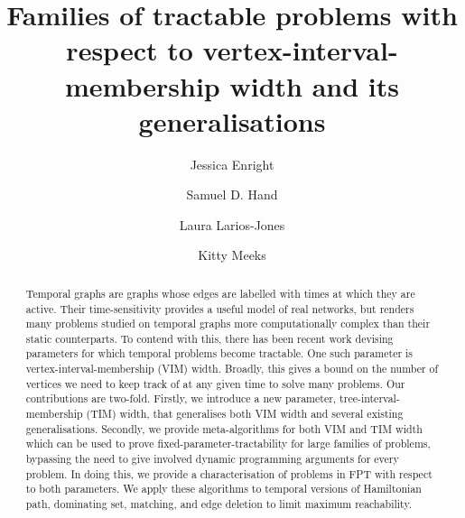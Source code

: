 \documentclass[a4paper,UKenglish,cleveref, autoref, thm-restate]{lipics-v2021} %
\title{Families of tractable problems with respect to vertex-interval-membership width and its generalisations } %
\author{Jessica Enright}{School of Computing Science, University of Glasgow, UK}{jessica.enright@glasgow.ac.uk}{0000-0002-0266-3292}{Supported by EPSRC grant EP/T004878/1.}
\author{Samuel D. Hand}{School of Computing Science, University of Glasgow, UK}{s.hand.1@research.gla.ac.uk}{0000-0001-8021-249X}{Supported by an EPSRC doctoral training account.}
\author{Laura Larios-Jones}{School of Computing Science, University of Glasgow, UK}{Laura.Larios-Jones@glasgow.ac.uk}{0000-0003-3322-0176}{}
\author{Kitty Meeks}{School of Computing Science, University of Glasgow, UK}{kitty.meeks@glasgow.ac.uk}{0000-0001-5299-3073}{Supported by EPSRC grants  EP/T004878/1 and EP/V032305/1.}
\begin{document}
\maketitle

\begin{abstract}
Temporal graphs are graphs whose edges are labelled with times at which they are active. Their time-sensitivity provides a useful model of real networks, but renders many problems studied on temporal graphs more computationally complex than their static counterparts. To contend with this, there has been recent work devising parameters for which temporal problems become tractable. One such parameter is vertex-interval-membership (VIM) width. Broadly, this gives a bound on the number of vertices we need to keep track of at any given time to solve many problems. Our contributions are two-fold.  Firstly, we introduce a new parameter, tree-interval-membership (TIM) width, that generalises both VIM width and several existing generalisations.  Secondly, we provide meta-algorithms for both VIM and TIM width which can be used to prove fixed-parameter-tractability for large families of problems, bypassing the need to give involved dynamic programming arguments for every problem. In doing this, we provide a characterisation of problems in FPT with respect to both parameters. We apply these algorithms to temporal versions of Hamiltonian path, dominating set, matching, and edge deletion to limit maximum reachability. 
\end{abstract}
\end{document}
